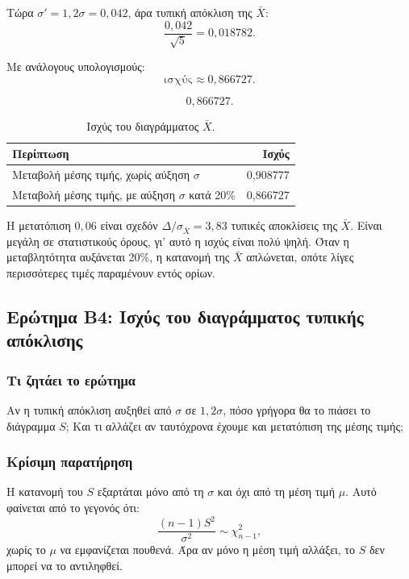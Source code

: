 \documentclass[12pt,a4paper]{article}
\begin{document}
Τώρα \(\sigma'=1{,}2\sigma=0{,}042\), άρα τυπική απόκλιση της \(\bar X\):
\[
    \frac{0{,}042}{\sqrt 5}=0{,}018782.
\]

Με ανάλογους υπολογισμούς:
\[
    \text{ισχύς}\approx 0{,}866727.
\]

\[
    \boxed{0{,}866727}.
\]

\begin{table}[H]
\centering
\caption{Ισχύς του διαγράμματος \(\bar X\).}
\begin{tabular}{lr}
\toprule
\textbf{Περίπτωση} & \textbf{Ισχύς} \\
\midrule
Μεταβολή μέσης τιμής, χωρίς αύξηση \(\sigma\) & 0,908777 \\
Μεταβολή μέσης τιμής, με αύξηση \(\sigma\) κατά 20\% & 0,866727 \\
\bottomrule
\end{tabular}
\end{table}

\begin{intuition}
Η μετατόπιση \(0{,}06\) είναι σχεδόν \(\Delta/\sigma_{\bar X}=3{,}83\) τυπικές
αποκλίσεις της \(\bar X\). Είναι μεγάλη σε στατιστικούς όρους, γι' αυτό η
ισχύς είναι πολύ ψηλή. Όταν η μεταβλητότητα αυξάνεται 20\%, η κατανομή της
\(\bar X\) απλώνεται, οπότε λίγες περισσότερες τιμές παραμένουν εντός ορίων.
\end{intuition}

\subsection{Ερώτημα Β4: Ισχύς του διαγράμματος τυπικής απόκλισης}

\subsubsection*{Τι ζητάει το ερώτημα}

Αν η τυπική απόκλιση αυξηθεί από \(\sigma\) σε \(1{,}2\sigma\), πόσο γρήγορα
θα το πιάσει το διάγραμμα \(S\); Και τι αλλάζει αν ταυτόχρονα έχουμε και
μετατόπιση της μέσης τιμής;

\subsubsection*{Κρίσιμη παρατήρηση}

Η κατανομή του \(S\) εξαρτάται μόνο από τη \(\sigma\) και όχι από τη μέση
τιμή \(\mu\). Αυτό φαίνεται από το γεγονός ότι:
\[
    \frac{(n-1)S^2}{\sigma^2}\sim\chi^2_{n-1},
\]
χωρίς το \(\mu\) να εμφανίζεται πουθενά. Άρα αν μόνο η μέση τιμή αλλάξει,
το \(S\) δεν μπορεί να το αντιληφθεί.
\end{document}
